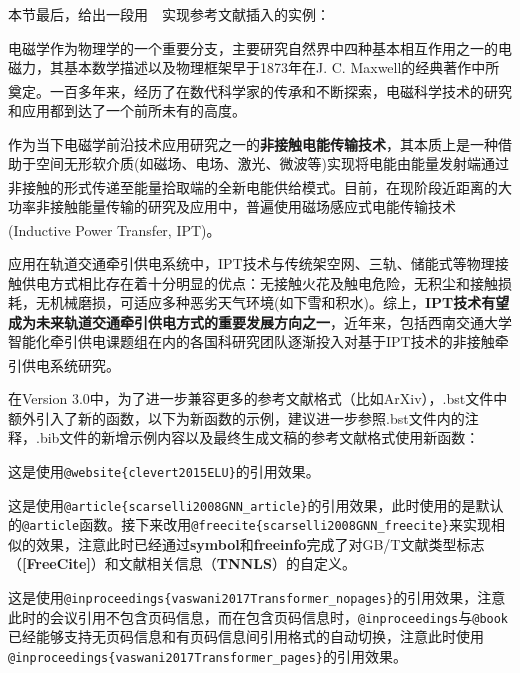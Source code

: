 \par
本节最后，给出一段用~\BibTeX{}~实现参考文献插入的实例：

\begin{framed}
	电磁学作为物理学的一个重要分支，主要研究自然界中四种基本相互作用之一的电磁力，其基本数学描述以及物理框架早于1873年在J. C. Maxwell的经典著作\cite{Maxwell1873}中所奠定。一百多年来，经历了在数代科学家的传承和不断探索\textsuperscript{\cite{Stratton1941,Cheng1989,Jackson1999,Guru2004,Kong2008,Griffiths2012,Purcell2013,Ida2015}}，电磁科学技术的研究和应用都到达了一个前所未有的高度。
	
	作为当下电磁学前沿技术应用研究之一的\textbf{非接触电能传输技术}，其本质上是一种借助于空间无形软介质(如磁场、电场、激光、微波等)实现将电能由能量发射端通过非接触的形式传递至能量拾取端的全新电能供给模式\textsuperscript{\cite{黄学良2013}}。目前，在现阶段近距离的大功率非接触能量传输的研究及应用中，普遍使用磁场感应式电能传输技术(Inductive Power Transfer, IPT)\textsuperscript{\cite{covic2013inductive}}。
	
	应用在轨道交通牵引供电系统中，IPT技术与传统架空网、三轨、储能式等物理接触供电方式相比存在着十分明显的优点：无接触火花及触电危险，无积尘和接触损耗，无机械磨损，可适应多种恶劣天气环境(如下雪和积水)。综上，\textbf{IPT技术有望成为未来轨道交通牵引供电方式的重要发展方向之一}，近年来，包括西南交通大学智能化牵引供电课题组在内的各国科研究团队逐渐投入对基于IPT技术的非接触牵引供电系统研究\textsuperscript{\cite{Buja2015,Kim2015}}。
\end{framed}

\par
在Version 3.0中，为了进一步兼容更多的参考文献格式（比如ArXiv），.bst文件中额外引入了新的函数，以下为新函数的示例，建议进一步参照.bst文件内的注释，.bib文件的新增示例内容以及最终生成文稿的参考文献格式使用新函数：

\begin{framed}
	这是使用\verb|@website{clevert2015ELU}|的引用效果\cite{clevert2015ELU}。

	这是使用\verb|@article{scarselli2008GNN_article}|的引用效果\cite{scarselli2008GNN_article}，此时使用的是默认的\verb|@article|函数。接下来改用\verb|@freecite{scarselli2008GNN_freecite}|来实现相似的效果，注意此时已经通过\textbf{symbol}和\textbf{freeinfo}完成了对GB/T文献类型标志（\textbf{[FreeCite]}）和文献相关信息（\textbf{TNNLS}）的自定义\cite{scarselli2008GNN_freecite}。

	这是使用\verb|@inproceedings{vaswani2017Transformer_nopages}|的引用效果，注意此时的会议引用不包含页码信息\cite{vaswani2017Transformer_nopages}，而在包含页码信息时，\verb|@inproceedings|与\verb|@book|已经能够支持无页码信息和有页码信息间引用格式的自动切换，注意此时使用\verb|@inproceedings{vaswani2017Transformer_pages}|的引用效果\cite{vaswani2017Transformer_pages}。
\end{framed}


